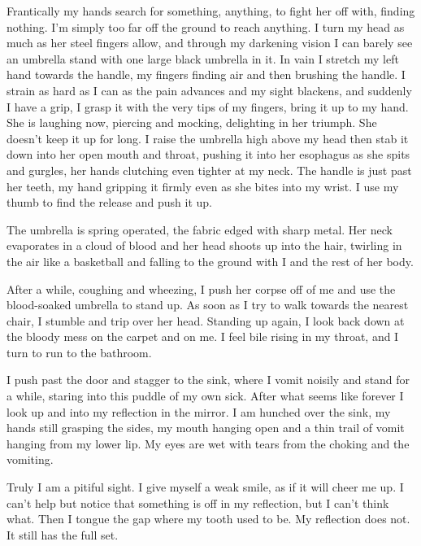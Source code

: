 Frantically my hands search for something, anything, to fight her
off with, finding nothing. I'm simply too far off the ground to
reach anything. I turn my head as much as her steel fingers allow,
and through my darkening vision I can barely see an umbrella stand
with one large black umbrella in it. In vain I stretch my left hand
towards the handle, my fingers finding air and then brushing the
handle. I strain as hard as I can as the pain advances and my sight
blackens, and suddenly I have a grip, I grasp it with the very tips
of my fingers, bring it up to my hand. She is laughing now,
piercing and mocking, delighting in her triumph. She doesn't keep
it up for long. I raise the umbrella high above my head then stab
it down into her open mouth and throat, pushing it into her
esophagus as she spits and gurgles, her hands clutching even
tighter at my neck. The handle is just past her teeth, my hand
gripping it firmly even as she bites into my wrist. I use my thumb
to find the release and push it up.



The umbrella is spring operated, the fabric edged with sharp metal.
Her neck evaporates in a cloud of blood and her head shoots up into
the hair, twirling in the air like a basketball and falling to the
ground with I and the rest of her body.



After a while, coughing and wheezing, I push her corpse off of me
and use the blood-soaked umbrella to stand up. As soon as I try to
walk towards the nearest chair, I stumble and trip over her head.
Standing up again, I look back down at the bloody mess on the
carpet and on me. I feel bile rising in my throat, and I turn to
run to the bathroom.



I push past the door and stagger to the sink, where I vomit noisily
and stand for a while, staring into this puddle of my own sick.
After what seems like forever I look up and into my reflection in
the mirror. I am hunched over the sink, my hands still grasping the
sides, my mouth hanging open and a thin trail of vomit hanging from
my lower lip. My eyes are wet with tears from the choking and the
vomiting.



Truly I am a pitiful sight. I give myself a weak smile, as if it
will cheer me up. I can't help but notice that something is off in
my reflection, but I can't think what. Then I tongue the gap where
my tooth used to be. My reflection does not. It still has the full
set.



